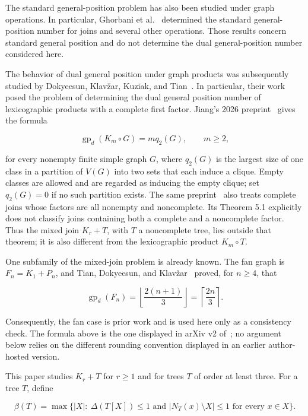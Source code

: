 \documentclass[11pt,a4paper]{article}
\numberwithin{equation}{section}
\begin{document}
The standard general-position problem has also been studied under graph
operations. In particular, Ghorbani et al.~\cite{ghorbani-et-al-operations}
determined the standard general-position number for joins and several
other operations. Those results concern standard general position and do
not determine the dual general-position number considered here.

The behavior of dual general position under graph products was
subsequently studied by Dokyeesun, Klav\v{z}ar, Kuziak, and Tian~\cite{dokyeesun-et-al-products}. In
particular, their work posed the problem of determining the dual general
position number of lexicographic products with a complete first factor.
Jiang's 2026 preprint~\cite[Theorem 3.2]{jiang-complete-first-factor} gives the formula

\[
\operatorname{gp}_d(K_m\circ G)=m q_2(G), \qquad m\ge 2,
\]

for every nonempty finite simple graph \(G\), where \(q_2(G)\) is the
largest size of one class in a partition of \(V(G)\) into two sets that
each induce a clique. Empty classes are allowed and are regarded as
inducing the empty clique; set \(q_2(G)=0\) if no such partition exists. The
same preprint~\cite[Theorem 5.1]{jiang-complete-first-factor} also treats
complete joins whose factors are all nonempty and noncomplete. Its Theorem 5.1 explicitly
does not classify joins containing both a complete and a noncomplete
factor. Thus the mixed join \(K_r+T\), with \(T\) a noncomplete tree,
lies outside that theorem; it is also different from the lexicographic
product \(K_m\circ T\).

One subfamily of the mixed-join problem is already known. The fan graph
is \(F_n=K_1+P_n\), and Tian, Dokyeesun, and Klav\v{z}ar~\cite[arXiv v2]{tian-et-al-removal}
proved, for \(n\ge 4\), that

\nopagebreak[4]
\[
\operatorname{gp}_d(F_n)
=\left\lfloor\frac{2(n+1)}{3}\right\rfloor
=\left\lceil\frac{2n}{3}\right\rceil.
\]

Consequently, the fan case is prior work and is used here only as a
consistency check. The formula above is the one displayed in arXiv v2
of~\cite{tian-et-al-removal}; no argument below relies on the different
rounding convention displayed in an earlier author-hosted version.

This paper studies \(K_r+T\) for \(r\ge 1\) and for trees \(T\) of order
at least three. For a tree \(T\), define

\[
\beta(T)=\max\bigl\{|X|:\ \Delta(T[X])\le 1
\text{ and } |N_T(x)\setminus X|\le 1\text{ for every }x\in X\bigr\}.
\]
\end{document}
